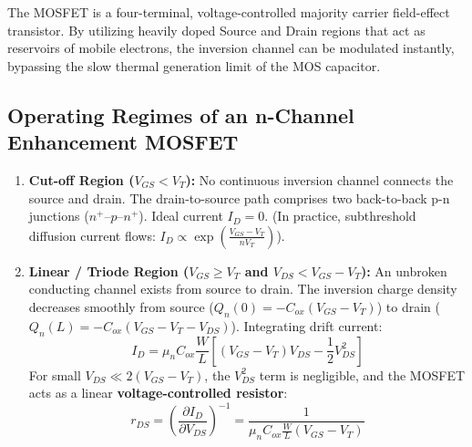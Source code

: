 \documentclass[12pt,a4paper]{article}
\begin{document}
The MOSFET is a four-terminal, voltage-controlled majority carrier field-effect transistor. By utilizing heavily doped Source and Drain regions that act as reservoirs of mobile electrons, the inversion channel can be modulated instantly, bypassing the slow thermal generation limit of the MOS capacitor.

\subsection{Operating Regimes of an n-Channel Enhancement MOSFET}
\begin{enumerate}[label=\arabic*., leftmargin=*]
  \item \textbf{Cut-off Region ($V_{GS} < V_T$):}
  No continuous inversion channel connects the source and drain. The drain-to-source path comprises two back-to-back p-n junctions ($n^+\text{--}p\text{--}n^+$). Ideal current $I_D = 0$. (In practice, subthreshold diffusion current flows: $I_D \propto \exp\left(\frac{V_{GS} - V_T}{n V_T}\right)$).

  \item \textbf{Linear / Triode Region ($V_{GS} \ge V_T$ and $V_{DS} < V_{GS} - V_T$):}
  An unbroken conducting channel exists from source to drain. The inversion charge density decreases smoothly from source ($Q_n(0) = -C_{ox}(V_{GS} - V_T)$) to drain ($Q_n(L) = -C_{ox}(V_{GS} - V_T - V_{DS})$). Integrating drift current:
  \begin{equation}
    I_D = \mu_n C_{ox} \frac{W}{L} \left[ (V_{GS} - V_T) V_{DS} - \frac{1}{2} V_{DS}^2 \right]
  \end{equation}
  For small $V_{DS} \ll 2(V_{GS} - V_T)$, the $V_{DS}^2$ term is negligible, and the MOSFET acts as a linear \textbf{voltage-controlled resistor}:
  \begin{equation}
    r_{DS} = \left(\frac{\partial I_D}{\partial V_{DS}}\right)^{-1} = \frac{1}{\mu_n C_{ox} \frac{W}{L} (V_{GS} - V_T)}
  \end{equation}


\end{enumerate}
\end{document}
